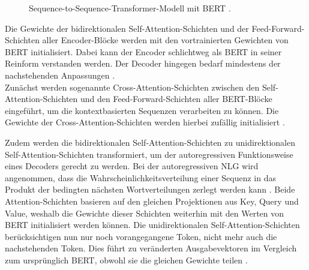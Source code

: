 \begin{figure}[h!]
  \centering
  \caption{Sequence-to-Sequence-Transformer-Modell mit BERT \cite{VON20}.}
  \label{pic:EncoderDecoderBert}
\end{figure}

\noindent
Die Gewichte der bidirektionalen Self-Attention-Schichten und der Feed-Forward-Schichten aller Encoder-Blöcke werden mit den vortrainierten Gewichten von \ac{BERT} initialisiert. Dabei kann der Encoder schlichtweg als \ac{BERT} in seiner Reinform verstanden werden. Der Decoder hingegen bedarf mindestens der nachstehenden Anpassungen \cite{VON20}.\\

\noindent
Zunächst werden sogenannte Cross-Attention-Schichten zwischen den Self-Attention-Schichten und den Feed-Forward-Schichten aller \ac{BERT}-Blöcke eingeführt, um die kontextbasierten Sequenzen verarbeiten zu können. Die Gewichte der Cross-Attention-Schichten werden hierbei zufällig initialisiert \cite{VON20}.
\newpage

\noindent
Zudem werden die bidirektionalen Self-Attention-Schichten zu unidirektionalen Self-Attention-Schichten transformiert, um der autoregressiven Funktionsweise eines Decoders gerecht zu werden. Bei der autoregressiven \ac{NLG} wird angenommen, dass die Wahrscheinlichkeitsverteilung einer Sequenz in das Produkt der bedingten nächsten Wortverteilungen zerlegt werden kann \cite{VON20}. Beide Attention-Schichten basieren auf den gleichen Projektionen aus Key, Query und Value, weshalb die Gewichte dieser Schichten weiterhin mit den Werten von \ac{BERT} initialisiert werden können. Die unidirektionalen Self-Attention-Schichten berücksichtigen nun nur noch vorangegangene Token, nicht mehr auch die nachstehenden Token. Dies führt zu veränderten Ausgabevektoren im Vergleich zum ursprünglich \ac{BERT}, obwohl sie die gleichen Gewichte teilen \cite[S.~2]{ROT20}.\\

